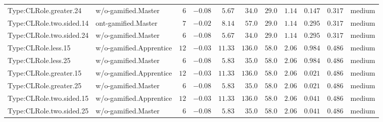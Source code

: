 \documentclass[6pt,a4paper]{article}
\begin{document}
{\begin{longtable}{llrrrrrrrrl}
Type:CLRole.greater.24&w/o-gamified.Master&$ 6$&$-0.08$&$ 5.67$&$ 34.0$&$ 29.0$&$1.14$&$0.147$&$0.317$&medium\tabularnewline
Type:CLRole.two.sided.14&ont-gamified.Master&$ 7$&$-0.02$&$ 8.14$&$ 57.0$&$ 29.0$&$1.14$&$0.295$&$0.317$&medium\tabularnewline
Type:CLRole.two.sided.24&w/o-gamified.Master&$ 6$&$-0.08$&$ 5.67$&$ 34.0$&$ 29.0$&$1.14$&$0.295$&$0.317$&medium\tabularnewline
Type:CLRole.less.15&w/o-gamified.Apprentice&$12$&$-0.03$&$11.33$&$136.0$&$ 58.0$&$2.06$&$0.984$&$0.486$&medium\tabularnewline
Type:CLRole.less.25&w/o-gamified.Master&$ 6$&$-0.08$&$ 5.83$&$ 35.0$&$ 58.0$&$2.06$&$0.984$&$0.486$&medium\tabularnewline
Type:CLRole.greater.15&w/o-gamified.Apprentice&$12$&$-0.03$&$11.33$&$136.0$&$ 58.0$&$2.06$&$0.021$&$0.486$&medium\tabularnewline
Type:CLRole.greater.25&w/o-gamified.Master&$ 6$&$-0.08$&$ 5.83$&$ 35.0$&$ 58.0$&$2.06$&$0.021$&$0.486$&medium\tabularnewline
\newpage
Type:CLRole.two.sided.15&w/o-gamified.Apprentice&$12$&$-0.03$&$11.33$&$136.0$&$ 58.0$&$2.06$&$0.041$&$0.486$&medium\tabularnewline
Type:CLRole.two.sided.25&w/o-gamified.Master&$ 6$&$-0.08$&$ 5.83$&$ 35.0$&$ 58.0$&$2.06$&$0.041$&$0.486$&medium\tabularnewline
\hline
\end{longtable}}
\end{document}
